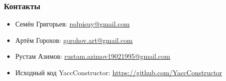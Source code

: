 \documentclass{beamer}
\begin{document}
            
\begin{frame}
\transwipe[direction=90]
\frametitle{Контакты}
\begin{itemize}
  \item Семён Григорьев: \url{rsdpisuy@gmail.com}
  \item Артём Горохов: \url{gorohov.art@gmail.com}
  \item Рустам Азимов: \url{rustam.azimov19021995@gmail.com}
  \item Исходный код YaccConstructor: \url{https://github.com/YaccConstructor}
\end{itemize}
\end{frame}
\end{document}
